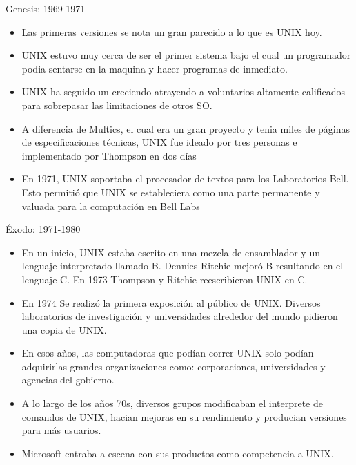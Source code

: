 \documentclass[11pt]{beamer}
\begin{document}
		\begin{frame}{Genesis: 1969-1971}
			\begin{itemize}
				\item Las primeras versiones se nota un gran parecido a lo que es UNIX hoy.
				\item UNIX estuvo muy cerca de ser el primer sistema bajo el cual un programador podia sentarse en la maquina y hacer programas de inmediato.
				\item UNIX ha seguido un creciendo atrayendo a voluntarios altamente calificados para sobrepasar las limitaciones de otros SO.
				\item A diferencia de Multics, el cual era un gran proyecto y tenia miles de páginas de especificaciones técnicas, UNIX fue ideado por tres personas e implementado por Thompson en dos días
				\item En 1971, UNIX soportaba el procesador de textos para los Laboratorios Bell. Esto permitió que UNIX se estableciera como una parte permanente y valuada para la computación en Bell Labs
			\end{itemize}
		\end{frame}
		\begin{frame}{Éxodo: 1971-1980}
			\begin{itemize}
				\item En un inicio, UNIX estaba escrito en una mezcla de ensamblador y un lenguaje interpretado llamado B. Dennies Ritchie mejoró B resultando en el lenguaje C. En 1973 Thompson y Ritchie reescribieron UNIX en C.
				\item En 1974 Se realizó la primera exposición al público de UNIX. Diversos laboratorios de investigación y universidades alrededor del mundo pidieron una copia de UNIX.
				\item En esos años, las computadoras que podían correr UNIX solo podían adquirirlas grandes organizaciones como: corporaciones, universidades y agencias del gobierno.
				\item A lo largo de los años 70s, diversos grupos modificaban el interprete de comandos de UNIX, hacian mejoras en su rendimiento y producian versiones para más usuarios.
				\item Microsoft entraba a escena con sus productos como competencia a UNIX.
			\end{itemize}
		\end{frame}
\end{document}

